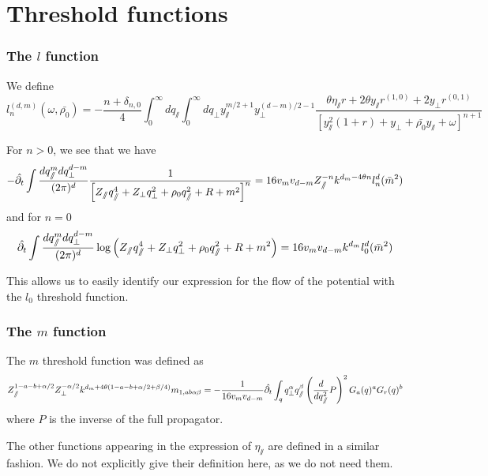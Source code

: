 \chapter{Threshold functions}
\label{app:thresholds}

\subsection{The $l$ function}
We define
\begin{equation}
l_n^{(d,m)}(\omega, \bar{\rho_0}) = -\frac{n+\delta_{n,0}}{4} \int_0^{\infty} dq_\sslash \int_0^{\infty} dq_\perp y_\sslash^{m/2+1} y_\perp^{(d-m)/2-1} \frac{\theta \eta_\sslash r + 2 \theta y_\sslash r^{(1,0)}+ 2 y_\perp r^{(0,1)}}{\left[y_\sslash^2(1+r) + y_\perp + \bar{\rho_0} y_\sslash + \omega\right]^{n+1}}
\end{equation}

For $n>0$, we see that we have
\begin{equation}
-\hat{\partial_{t}} \int \frac{dq_\sslash^{m} dq_\perp^{d-m}}{(2\pi)^d} \frac{1}{\left[ Z_\sslash q_\sslash^4 + Z_\perp q_\perp^2 + \rho_0 q_\sslash^2 + R + m^2 \right]^{n}} = 16 v_m v_{d-m} Z_\sslash^{-n} k^{d_m-4\theta n} l_n^{d}(\bar{m}^2)
\end{equation}
and for $n=0$
\begin{equation}
\hat{\partial_{t}} \int \frac{dq_\sslash^{m} dq_\perp^{d-m}}{(2\pi)^d} \log{ \left( Z_\sslash q_\sslash^4 + Z_\perp q_\perp^2 + \rho_0 q_\sslash^2 + R + m^2 \right) } = 16 v_m v_{d-m} k^{d_m} l_0^{d}(\bar{m}^2)
\end{equation}

This allows us to easily identify our expression for the flow of the potential with the $l_0$ threshold function.

\subsection{The $m$ function}
The $m$ threshold function was defined as
\begin{equation}
Z_\sslash^{1-a-b+\alpha/2} Z_\perp^{-\alpha/2} k^{d_m + 4\theta(1-a-b+\alpha/2+\beta/4)} m_{1,ab\alpha \beta} = -\frac{1}{16 v_m v_{d-m}} \hat{\partial_{t}} \int_q q_\perp^\alpha q_\sslash^\beta \left(\frac{d}{d q_\sslash^2} P\right)^2 G_a(q)^a G_r(q)^b
\end{equation}
where $P$ is the inverse of the full propagator.

The other functions appearing in the expression of $\eta_\sslash$ are defined in a similar fashion. We do not explicitly give their definition here, as we do not need them.